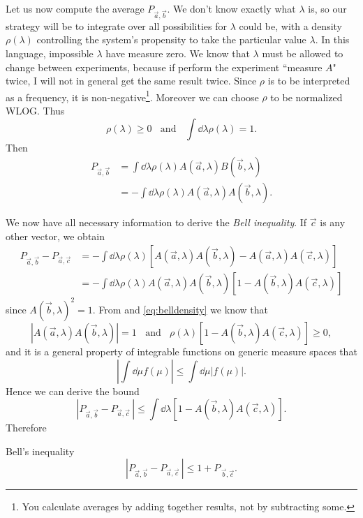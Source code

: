 Let us now compute the average $P_{\vec{a},\vec{b}}$. We don't know 
exactly what $\lambda$ is, so our strategy will be to integrate over all 
possibilities for $\lambda$
could be, with a density $\rho(\lambda)$ controlling the system's propensity
to take the particular value $\lambda$. In this language, impossible
$\lambda$ have measure zero. We know that $\lambda$ must be allowed to
change between experiments, because if perform the experiment ``measure $A$"
twice, I will not in general get the same result twice. Since $\rho$ is to
be interpreted as a frequency, it is non-negative\footnote{You calculate
averages by adding together results, not by subtracting some.}.
Moreover we can choose $\rho$ to be normalized WLOG. Thus
\begin{equation}\label{eq:belldensity}
  \rho(\lambda)\geq 0~~~~\text{and}~~~~\int\dd{\lambda}\rho(\lambda)=1.
\end{equation}
Then
\begin{equation}\begin{aligned}
  P_{\vec{a},\vec{b}}
         &=\int\dd{\lambda}\rho(\lambda)A(\vec{a},\lambda)B(\vec{b},\lambda)\\
         &=-\int\dd{\lambda}\rho(\lambda)A(\vec{a},\lambda)A(\vec{b},\lambda).
\end{aligned}\end{equation}

We now have all necessary information to derive the {\it Bell inequality}. 
If $\vec{c}$ is any other vector, we obtain
\begin{equation}\begin{aligned}
  P_{\vec{a},\vec{b}}-P_{\vec{a},\vec{c}}
   &=-\int\dd{\lambda}\rho(\lambda)
      \left[A(\vec{a},\lambda)A(\vec{b},\lambda)-
            A(\vec{a},\lambda)A(\vec{c},\lambda)\right]\\
   &=-\int\dd{\lambda}\rho(\lambda)
      A(\vec{a},\lambda)A(\vec{b},\lambda)
      \left[1-A(\vec{b},\lambda)A(\vec{c},\lambda)\right]
\end{aligned}\end{equation}
since $A(\vec{b},\lambda)^2=1$. From  and
\eqref{eq:belldensity} we know that
\begin{equation}
  |A(\vec{a},\lambda)A(\vec{b},\lambda)|=1~~~~\text{and}~~~~
  \rho(\lambda)\left[1-A(\vec{b},\lambda)A(\vec{c},\lambda)\right]\geq0,
\end{equation}
and it is a general property of integrable functions on generic
measure spaces that
\begin{equation}
  \left|\int\dd{\mu}f(\mu)\right|\leq\int\dd{\mu}|f(\mu)|.
\end{equation}
Hence we can derive the bound
\begin{equation}
  |P_{\vec{a},\vec{b}}-P_{\vec{a},\vec{c}}\,|
  \leq\int\dd{\lambda}\left[1-A(\vec{b},\lambda)A(\vec{c},\lambda)\right].
\end{equation}
Therefore
\begin{theorem}{Bell's inequality}{}
  $$
  |P_{\vec{a},\vec{b}}-P_{\vec{a},\vec{c}}\,|
  \leq1+P_{\,\vec{b},\vec{c}}.
  $$
\end{theorem}


